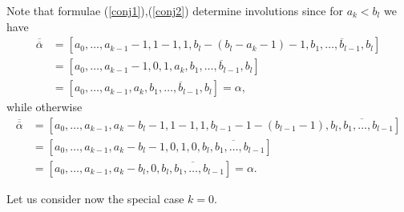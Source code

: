 \documentclass[11pt,reqno]{amsart}
\newtheorem{Corollary}{Corollary}
\begin{document}


Note that formulae (\ref{conj1}),(\ref{conj2}) determine involutions since for $a_k<b_l$ we have
\begin{align*}
\overline{\overline{\alpha}} &= \left[a_0, \ldots, a_{k-1}-1, 1-1, 1, b_l - \left( b_l - a_k - 1 \right) - 1 , \overline{b_1, \ldots, b_{l-1}, b_l}\right] \\
&= \left[a_0, \ldots, a_{k-1}-1, 0, 1, a_k , \overline{b_1, \ldots, b_{l-1}, b_l}\right] \\
&= \left[a_0, \ldots, a_{k-1}, a_k , \overline{b_1, \ldots, b_{l-1}, b_l}\right] = \alpha,
\end{align*}
while otherwise
\begin{align*}
\overline{\overline{\alpha}} &= \left[a_0, \ldots, a_{k-1}, a_k - b_l -1, 1-1, 1, b_{l-1}-1 -\left(b_{l-1}-1\right), \overline{b_{l}, b_1, \ldots, b_{l-1}}\right] \\
&= \left[a_0, \ldots, a_{k-1}, a_k - b_l -1, 0, 1, 0, \overline{b_{l}, b_1, \ldots, b_{l-1}}\right] \\
&= \left[a_0, \ldots, a_{k-1}, a_k- b_l, 0, \overline{b_{l}, b_1, \ldots, b_{l-1}}\right] = \alpha.
\end{align*}


Let us consider now the special case $k=0.$
\end{document}
